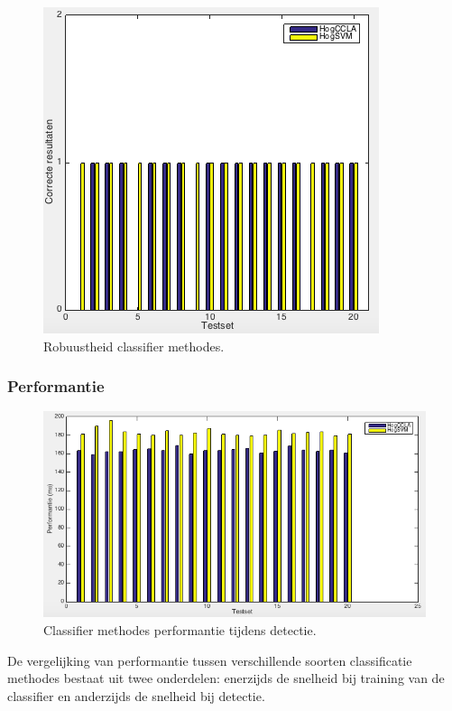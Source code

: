 \begin{figure}
  \centering
  \includegraphics[width=0.75\linewidth]{img/ClassRobust}
  \caption{Robuustheid classifier methodes.}
  \label{fig:classRobuust}
\end{figure}

\subsubsection*{Performantie}

\begin{figure}
  \centering
  \includegraphics[width=\linewidth]{img/ClassPerf}
  \caption{Classifier methodes performantie tijdens detectie.}
  \label{fig:class_perf}
\end{figure}

De vergelijking van performantie tussen verschillende soorten classificatie methodes bestaat uit twee onderdelen: enerzijds de snelheid bij training van de classifier en anderzijds de snelheid bij detectie.

